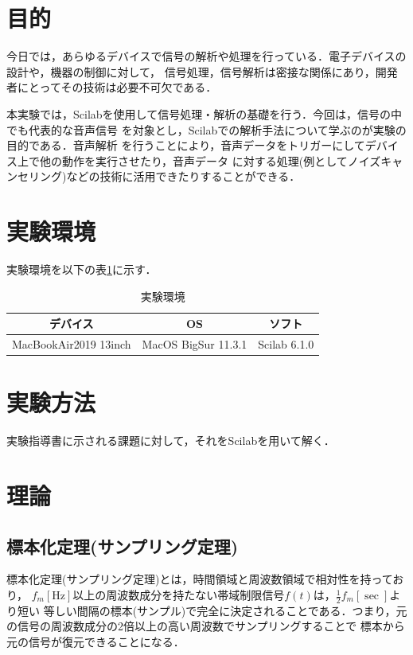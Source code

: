 \documentclass[a4paper,11pt]{jsarticle}
\begin{document}
\section{目的}
今日では，あらゆるデバイスで信号の解析や処理を行っている．電子デバイスの設計や，機器の制御に対して，
信号処理，信号解析は密接な関係にあり，開発者にとってその技術は必要不可欠である．\par
本実験では，Scilabを使用して信号処理・解析の基礎を行う．今回は，信号の中でも代表的な音声信号
を対象とし，Scilabでの解析手法について学ぶのが実験の目的である．音声解析
を行うことにより，音声データをトリガーにしてデバイス上で他の動作を実行させたり，音声データ
に対する処理(例としてノイズキャンセリング)などの技術に活用できたりすることができる．


\section{実験環境}
実験環境を以下の表\ref{T:emviroment}に示す．
\begin{table}[H]
  \begin{center}
    \caption{実験環境}
    \begin{tabular}{|c|c|c|}  \hline
      デバイス              & OS                  & ソフト       \\ \hline
      MacBookAir2019 13inch & MacOS BigSur 11.3.1 & Scilab 6.1.0 \\ \hline
    \end{tabular}
    \label{T:emviroment}
  \end{center}
\end{table}

\section{実験方法}
実験指導書\cite{text}に示される課題に対して，それをScilabを用いて解く．

\section{理論}
\subsection{標本化定理(サンプリング定理)}
標本化定理(サンプリング定理)\cite{sampling}とは，時間領域と周波数領域で相対性を持っており，
$f_m[\si{\hertz}]$以上の周波数成分を持たない帯域制限信号$f(t)$は，$\frac{1}{2}f_m[\si{\sec}]$より短い
等しい間隔の標本(サンプル)で完全に決定されることである．つまり，元の信号の周波数成分の2倍以上の高い周波数でサンプリングすることで
標本から元の信号が復元できることになる．
\end{document}
